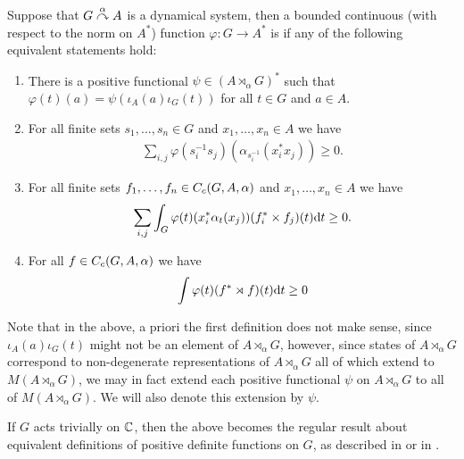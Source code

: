 \begin{definition}
Suppose that $G \stackrel{\alpha}{\curvearrowright} A$ is a dynamical system, then a bounded continuous (with respect to the norm on $A^*$) function $\varphi \colon G \to A^*$ is  if any of the following equivalent statements hold:
\begin{enumerate}[nosep]
	\item There is a positive functional $\psi \in (A \rtimes_\alpha G)^*$ such that $\varphi(t)(a) = \psi(\iota_A(a) \iota_G(t))$ for all $t \in G$ and $a \in A$.
	\item For all finite sets $s_1,\dots,s_n \in G$ and $x_1,\dots,x_n \in A$ we have
		\begin{align*}
			\sum_{i,j} \varphi (s_i^{-1}s_j)(\alpha_{s_{i}^{-1}}(x_{i}^* x_{j})) \geq 0 .
		\end{align*}
	\item For all finite sets $f_1,\dots,f_n \in C_c(G,A,\alpha)$ and $x_1,\dots,x_n \in A$ we have
		\begin{align*}
			\sum_{i,j}\int_G \varphi(t)(x_{i}^*\alpha_t(x_j))(f_i^* \times f_j)(t) \mathrm{d} t \geq 0.
		\end{align*}
	\item For all $f \in C_c(G,A,\alpha)$ we have
		\begin{align*}
			\int \varphi(t)(f^* \rtimes f)(t) \mathrm{d} t \geq 0
		\end{align*}
\end{enumerate}
\end{definition}
\begin{remark}
Note that in the above, a priori the first definition does not make sense, since $\iota_A(a) \iota_G(t)$ might not be an element of $A \rtimes_\alpha G$, however, since states of $A \rtimes_\alpha G$ correspond to non-degenerate representations of $A \rtimes_\alpha G$ all of which extend to $M(A \rtimes_\alpha G)$, we may in fact extend each positive functional $\psi$ on $A \rtimes_\alpha G$ to all of $M(A \rtimes_\alpha G)$. We will also denote this extension by $\psi$. 
\end{remark}
If $G$ acts trivially on $\mathbb{C}$, then the above becomes the regular result about equivalent definitions of positive definite functions on $G$, as described in \cite{folland2016fourier} or in \cite{pedersenalgauto}.

